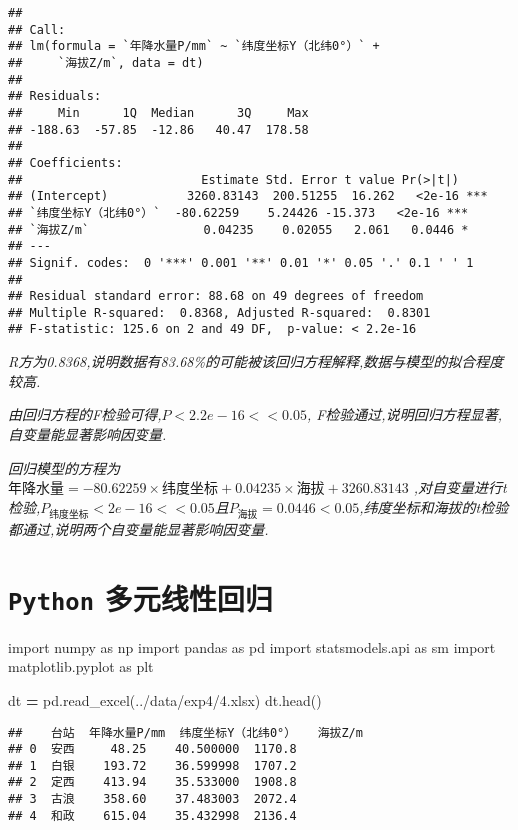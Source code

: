 \documentclass[
]{article}
\newenvironment{Shaded}{\begin{snugshade}}{\end{snugshade}}
\newcommand{\ImportTok}[1]{#1}
\newcommand{\NormalTok}[1]{#1}
\newcommand{\OperatorTok}[1]{\textcolor[rgb]{0.81,0.36,0.00}{\textbf{#1}}}
\newcommand{\StringTok}[1]{\textcolor[rgb]{0.31,0.60,0.02}{#1}}
\begin{document}
\begin{verbatim}
## 
## Call:
## lm(formula = `年降水量P/mm` ~ `纬度坐标Y（北纬0°）` + 
##     `海拔Z/m`, data = dt)
## 
## Residuals:
##     Min      1Q  Median      3Q     Max 
## -188.63  -57.85  -12.86   40.47  178.58 
## 
## Coefficients:
##                         Estimate Std. Error t value Pr(>|t|)    
## (Intercept)           3260.83143  200.51255  16.262   <2e-16 ***
## `纬度坐标Y（北纬0°）`  -80.62259    5.24426 -15.373   <2e-16 ***
## `海拔Z/m`                0.04235    0.02055   2.061   0.0446 *  
## ---
## Signif. codes:  0 '***' 0.001 '**' 0.01 '*' 0.05 '.' 0.1 ' ' 1
## 
## Residual standard error: 88.68 on 49 degrees of freedom
## Multiple R-squared:  0.8368, Adjusted R-squared:  0.8301 
## F-statistic: 125.6 on 2 and 49 DF,  p-value: < 2.2e-16
\end{verbatim}

\emph{R方为0.8368,说明数据有83.68\%的可能被该回归方程解释,数据与模型的拟合程度较高.}

\emph{由回归方程的F检验可得,\(P < 2.2e-16 << 0.05\),
F检验通过,说明回归方程显著,自变量能显著影响因变量.}

\emph{回归模型的方程为
\(\text{年降水量} = -80.62259 \times \text{纬度坐标} + 0.04235 \times \text{海拔} + 3260.83143\)
,对自变量进行t检验,\(P_{\text{纬度坐标}} < 2e-16 << 0.05\)且\(P_{\text{海拔}} = 0.0446 < 0.05\),纬度坐标和海拔的t检验都通过,说明两个自变量能显著影响因变量.}

\section{\texorpdfstring{\texttt{Python}
多元线性回归}{Python 多元线性回归}}\label{python-ux591aux5143ux7ebfux6027ux56deux5f52}

\begin{Shaded}
\begin{Highlighting}[]
\ImportTok{import}\NormalTok{ numpy }\ImportTok{as}\NormalTok{ np}
\ImportTok{import}\NormalTok{ pandas }\ImportTok{as}\NormalTok{ pd}
\ImportTok{import}\NormalTok{ statsmodels.api }\ImportTok{as}\NormalTok{ sm}
\ImportTok{import}\NormalTok{ matplotlib.pyplot }\ImportTok{as}\NormalTok{ plt}

\NormalTok{dt }\OperatorTok{=}\NormalTok{ pd.read\_excel(}\StringTok{\textquotesingle{}../data/exp4/4.xlsx\textquotesingle{}}\NormalTok{)}
\NormalTok{dt.head()}
\end{Highlighting}
\end{Shaded}

\begin{verbatim}
##    台站  年降水量P/mm  纬度坐标Y（北纬0°）   海拔Z/m
## 0  安西     48.25    40.500000  1170.8
## 1  白银    193.72    36.599998  1707.2
## 2  定西    413.94    35.533000  1908.8
## 3  古浪    358.60    37.483003  2072.4
## 4  和政    615.04    35.432998  2136.4
\end{verbatim}
\end{document}
